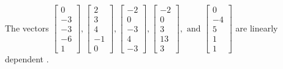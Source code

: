 \begin{exercise}
\begin{exerciseStatement}
  \end{exerciseStatement}
  \begin{exerciseAnswer}
   The vectors \(\left[\begin{array}{r}
0 \\
-3 \\
-3 \\
-6 \\
1
\end{array}\right] , \left[\begin{array}{r}
2 \\
3 \\
4 \\
-1 \\
0
\end{array}\right] , \left[\begin{array}{r}
-2 \\
0 \\
-3 \\
4 \\
-3
\end{array}\right] , \left[\begin{array}{r}
-2 \\
0 \\
3 \\
13 \\
3
\end{array}\right] , \text{ and } \left[\begin{array}{r}
0 \\
-4 \\
5 \\
1 \\
1
\end{array}\right]\) are 
  	 linearly dependent  .
  


  \end{exerciseAnswer}
\end{exercise}